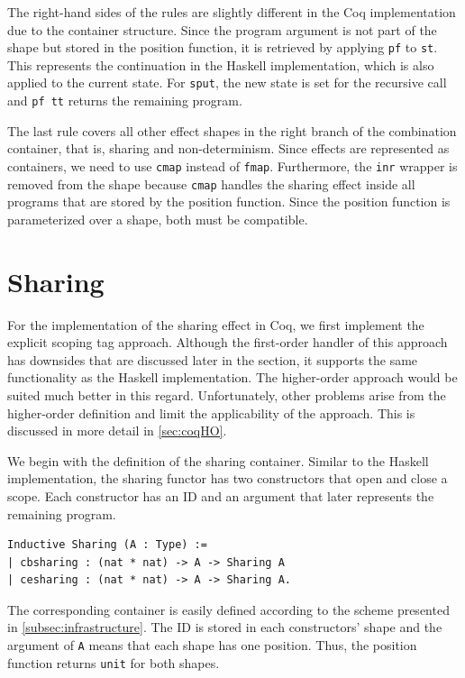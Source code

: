 \documentclass[a4paper, 11pt, fleqn, twoside]{scrreprt}
\newcommand{\cinl}[1]{\texttt{#1}}
\begin{document}
The right-hand sides of the rules are slightly different in the Coq implementation due to the container structure.
Since the program argument is not part of the shape but stored in the position function, it is retrieved by applying \cinl{pf} to \cinl{st}.
This represents the continuation in the Haskell implementation, which is also applied to the current state.
For \cinl{sput}, the new state is set for the recursive call and \cinl{pf tt} returns the remaining program.

The last rule covers all other effect shapes in the right branch of the combination container, that is, sharing and non-determinism.
Since effects are represented as containers, we need to use \cinl{cmap} instead of \cinl{fmap}.
Furthermore, the \cinl{inr} wrapper is removed from the shape because \cinl{cmap} handles the sharing effect inside all programs that are stored by the position function.
Since the position function is parameterized over a shape, both must be compatible.

\section{Sharing}
\label{sec:lawsOfSharing}
For the implementation of the sharing effect in Coq, we first implement the explicit scoping tag approach.
Although the first-order handler of this approach has downsides that are discussed later in the section, it supports the same functionality as the Haskell implementation.
The higher-order approach would be suited much better in this regard.
Unfortunately, other problems arise from the higher-order definition and limit the applicability of the approach.
This is discussed in more detail in \autoref{sec:coqHO}.

We begin with the definition of the sharing container.
Similar to the Haskell implementation, the sharing functor has two constructors that open and close a scope.
Each constructor has an ID and an argument that later represents the remaining program.

\begin{verbatim}
Inductive Sharing (A : Type) :=
| cbsharing : (nat * nat) -> A -> Sharing A
| cesharing : (nat * nat) -> A -> Sharing A.
\end{verbatim}

The corresponding container is easily defined according to the scheme presented in \autoref{subsec:infrastructure}.
The ID is stored in each constructors' shape and the argument of \cinl{A} means that each shape has one position.
Thus, the position function returns \cinl{unit} for both shapes.
\end{document}
